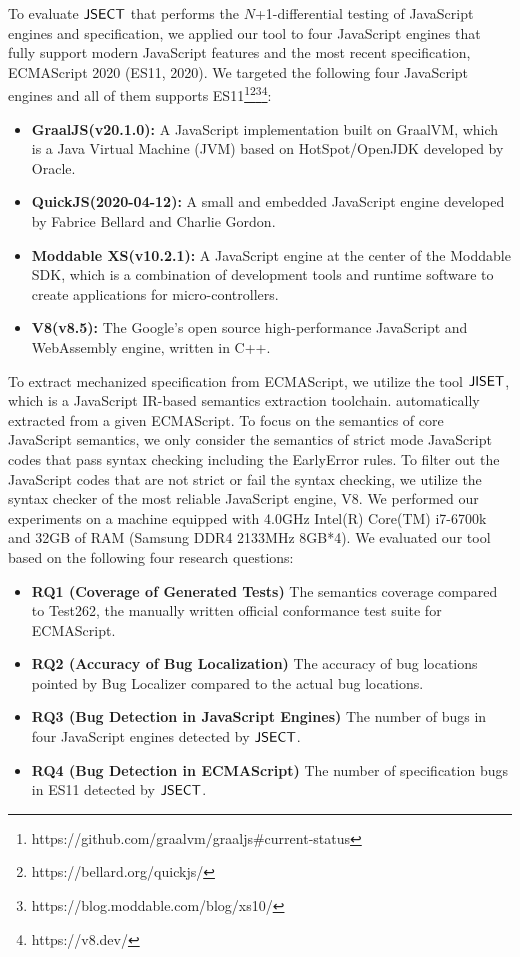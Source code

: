 To evaluate $\text{\sf JSECT}$ that performs the $N$+1-differential testing of JavaScript
engines and specification, we applied our tool to four JavaScript engines that
fully support modern JavaScript features and the most recent specification,
ECMAScript 2020 (ES11, 2020).  We targeted the following four JavaScript
engines and all of them supports
ES11\footnote{https://github.com/graalvm/graaljs\#current-status}\footnote{https://bellard.org/quickjs/}\footnote{https://blog.moddable.com/blog/xs10/}\footnote{https://v8.dev/}:
\begin{itemize}
  \item \textbf{GraalJS(v20.1.0):} A JavaScript implementation built on
    GraalVM\cite{graaljs}, which is a Java Virtual Machine (JVM) based on
    HotSpot/OpenJDK developed by Oracle.
  \item \textbf{QuickJS(2020-04-12):} A small and embedded JavaScript engine developed by
    Fabrice Bellard and Charlie Gordon\cite{qjs}.
  \item \textbf{Moddable XS(v10.2.1):} A JavaScript engine at the center of the Moddable
    SDK\cite{xs}, which is a combination of development tools and runtime
    software to create applications for micro-controllers.
  \item \textbf{V8(v8.5):} The Google's open source high-performance JavaScript and
    WebAssembly engine\cite{v8}, written in C++.
\end{itemize}
To extract mechanized specification from ECMAScript, we utilize the tool
$\text{\sf JISET}$, which is a JavaScript IR-based semantics extraction toolchain.
automatically extracted from a given ECMAScript.  To focus on the semantics of
core JavaScript semantics, we only consider the semantics of strict mode
JavaScript codes that pass syntax checking including the EarlyError rules.  To
filter out the JavaScript codes that are not strict or fail the syntax checking,
we utilize the syntax checker of the most reliable JavaScript engine, V8.
We performed our experiments on a machine equipped with 4.0GHz Intel(R) Core(TM)
i7-6700k and 32GB of RAM (Samsung DDR4 2133MHz 8GB*4).  We evaluated our tool
based on the following four research questions:
\begin{itemize}
  \item {\bf RQ1 (Coverage of Generated Tests)} The semantics coverage compared
    to Test262, the manually written official conformance test suite for
    ECMAScript.
  \item {\bf RQ2 (Accuracy of Bug Localization)} The accuracy of bug locations
    pointed by \textsf{Bug Localizer} compared to the actual bug locations.
  \item {\bf RQ3 (Bug Detection in JavaScript Engines)} The number of bugs in
    four JavaScript engines detected by $\text{\sf JSECT}$.
  \item {\bf RQ4 (Bug Detection in ECMAScript)} The number of specification bugs
    in ES11 detected by $\text{\sf JSECT}$.
\end{itemize}


